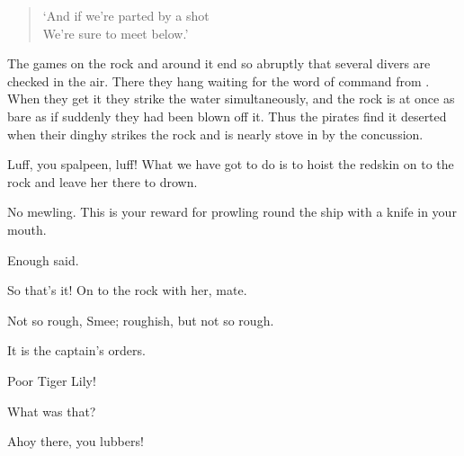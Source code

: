 \begin{drama}
{\begin{verse}
	‘And if we’re parted by a shot\\
	We’re sure to meet below.’
\end{verse}

The games on the rock and around it end so abruptly that several divers are checked in the air.
There they hang waiting for the word of command from \peter.
When they get it they strike the water simultaneously, and the rock is at once as bare as if suddenly they had been blown off it.
Thus the pirates find it deserted when their dinghy strikes the rock and is nearly stove in by the concussion.}

\smeespeaks
Luff, you spalpeen, luff!
What we have got to do is to hoist the redskin on to the rock and leave her there to drown.


No mewling.
This is your reward for prowling round the ship with a knife in your mouth.

Enough said.

So that’s it!
On to the rock with her, mate.

Not so rough, Smee; roughish, but not so rough.

It is the captain’s orders.


Poor Tiger Lily!

\starkeyspeaks
What was that?

Ahoy there, you lubbers!


\end{drama}
